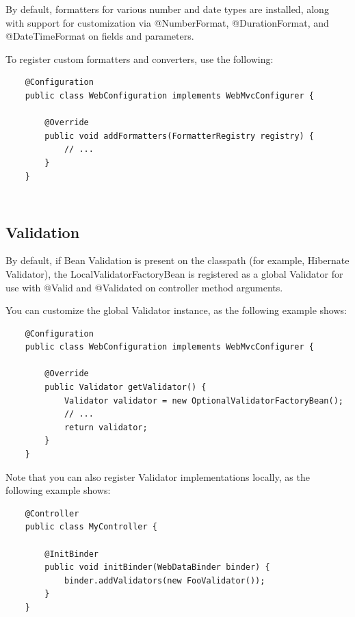\documentclass{scrartcl}
\begin{document}
By default, formatters for various number and date types are installed, along with support for customization via @NumberFormat, @DurationFormat, and @DateTimeFormat on fields and parameters.

To register custom formatters and converters, use the following:

\begin{lstlisting}
    @Configuration
    public class WebConfiguration implements WebMvcConfigurer {

        @Override
        public void addFormatters(FormatterRegistry registry) {
            // ...
        }
    }
\end{lstlisting}

\begin{lstlisting}
\end{lstlisting}

\begin{lstlisting}
\end{lstlisting}

\subsection{Validation}

By default, if Bean Validation is present on the classpath (for example, Hibernate Validator), the LocalValidatorFactoryBean is registered as a global Validator for use with @Valid and @Validated on controller method arguments.

You can customize the global Validator instance, as the following example shows:

\begin{lstlisting}
    @Configuration
    public class WebConfiguration implements WebMvcConfigurer {

        @Override
        public Validator getValidator() {
            Validator validator = new OptionalValidatorFactoryBean();
            // ...
            return validator;
        }
    }
\end{lstlisting}

Note that you can also register Validator implementations locally, as the following example shows:

\begin{lstlisting}
    @Controller
    public class MyController {

        @InitBinder
        public void initBinder(WebDataBinder binder) {
            binder.addValidators(new FooValidator());
        }
    }

\end{lstlisting}
\end{document}

